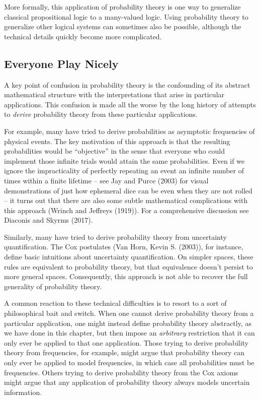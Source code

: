 \documentclass[
  letterpaper,
  DIV=11,
  numbers=noendperiod]{scrartcl}
\begin{document}
More formally, this application of probability theory is one way to
generalize classical propositional logic to a many-valued logic. Using
probability theory to generalize other logical systems can sometimes
also be possible, although the technical details quickly become more
complicated.

\subsection{Everyone Play Nicely}\label{everyone-play-nicely}

A key point of confusion in probability theory is the confounding of its
abstract mathematical structure with the interpretations that arise in
particular applications. This confusion is made all the worse by the
long history of attempts to \emph{derive} probability theory from these
particular applications.

For example, many have tried to derive probabilities as asymptotic
frequencies of physical events. The key motivation of this approach is
that the resulting probabilities would be ``objective'' in the sense
that everyone who could implement those infinite trials would attain the
same probabilities. Even if we ignore the impracticality of perfectly
repeating an event an infinite number of times within a finite lifetime
-- see Jay and Purce (2003) for visual demonstrations of just how
ephemeral dice can be even when they are not rolled -- it turns out that
there are also some subtle mathematical complications with this approach
(Wrinch and Jeffreys (1919)). For a comprehensive discussion see
Diaconis and Skyrms (2017).

Similarly, many have tried to derive probability theory from uncertainty
quantification. The Cox postulates (Van Horn, Kevin S. (2003)), for
instance, define basic intuitions about uncertainty quantification. On
simpler spaces, these rules are equivalent to probability theory, but
that equivalence doesn't persist to more general spaces. Consequently,
this approach is not able to recover the full generality of probability
theory.

A common reaction to these technical difficulties is to resort to a sort
of philosophical bait and switch. When one cannot derive probability
theory from a particular application, one might instead define
probability theory abstractly, as we have done in this chapter, but then
impose an \emph{arbitrary} restriction that it can only ever be applied
to that one application. Those trying to derive probability theory from
frequencies, for example, might argue that probability theory can only
ever be applied to model frequencies, in which case all probabilities
must be frequencies. Others trying to derive probability theory from the
Cox axioms might argue that any application of probability theory always
models uncertain information.
\end{document}
